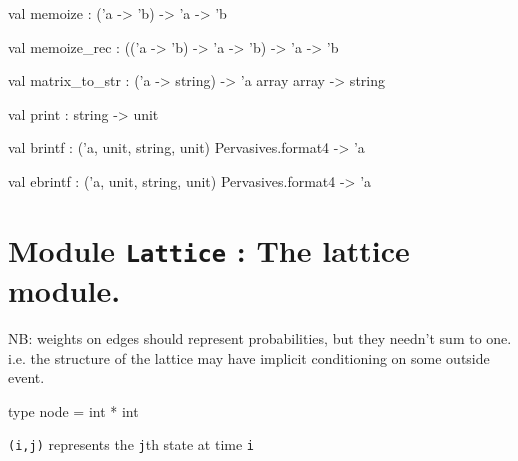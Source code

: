 \documentclass[11pt]{article}
\begin{document}
\label{val:Util.memoize}\begin{ocamldoccode}
val memoize : ('a -> 'b) -> 'a -> 'b
\end{ocamldoccode}




\label{val:Util.memoize-underscorerec}\begin{ocamldoccode}
val memoize_rec : (('a -> 'b) -> 'a -> 'b) -> 'a -> 'b
\end{ocamldoccode}




\label{val:Util.matrix-underscoreto-underscorestr}\begin{ocamldoccode}
val matrix_to_str : ('a -> string) -> 'a array array -> string
\end{ocamldoccode}




\label{val:Util.print}\begin{ocamldoccode}
val print : string -> unit
\end{ocamldoccode}




\label{val:Util.brintf}\begin{ocamldoccode}
val brintf : ('a, unit, string, unit) Pervasives.format4 -> 'a
\end{ocamldoccode}




\label{val:Util.ebrintf}\begin{ocamldoccode}
val ebrintf : ('a, unit, string, unit) Pervasives.format4 -> 'a
\end{ocamldoccode}


\section{Module {\tt{Lattice}} : The lattice module.}
\label{module:Lattice}
  NB:  weights on edges should represent probabilities, but
     they needn't sum to one.  i.e. the structure of the lattice may have implicit 
     conditioning on some outside event.



\ocamldocvspace{0.5cm}



\label{type:Lattice.node}\begin{ocamldoccode}
type node = int * int 
\end{ocamldoccode}
\begin{ocamldocdescription}
{\tt{(i,j)}} represents the {\tt{j}}th state at time {\tt{i}}


\end{ocamldocdescription}
\end{document}
